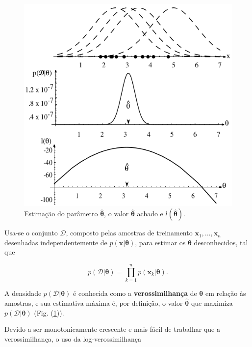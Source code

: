 \documentclass[a4paper,12pt,twocolumn]{article}
\newcommand{\figureref}[1]{Fig. (\ref{fig:#1})}
\begin{document}
\begin{figure}[ht]
    \centering
    \includegraphics[width=\columnwidth]{maximum-likelihood}
    \caption{Estimação do parâmetro $\boldsymbol{\hat{\theta}}$, o valor $\boldsymbol{\hat{\theta}}$ achado e $l(\boldsymbol{\hat{\theta}})$.}
    \label{fig:maximum-likelihood}
\end{figure}

Usa-se o conjunto $\mathcal{D}$, composto pelas amostras de treinamento $\boldsymbol{x}_1, ..., \boldsymbol{x}_n$ desenhadas independentemente de $p(\boldsymbol{x}|\boldsymbol{\theta})$, para estimar os $\boldsymbol{\theta}$ desconhecidos, tal que

\begin{equation}
    p(\mathcal{D}|\boldsymbol{\theta}) = \prod_{k=1}^{n} p(\boldsymbol{x}_k|\boldsymbol{\theta}).
    \label{eq:pdf_D}
\end{equation}

\noindent A densidade $p(\mathcal{D}|\boldsymbol{\theta})$ é conhecida como a \textbf{verossimilhança} de $\boldsymbol{\theta}$ em relação às amostras, e sua estimativa máxima é, por definição, o valor $\boldsymbol{\hat{\theta}}$ que maximiza  $p(\mathcal{D}|\boldsymbol{\theta})$ (\figureref{maximum-likelihood}).

Devido a ser monotonicamente crescente e mais fácil de trabalhar que a verossimilhança, o uso da log-verossimilhança
\end{document}
